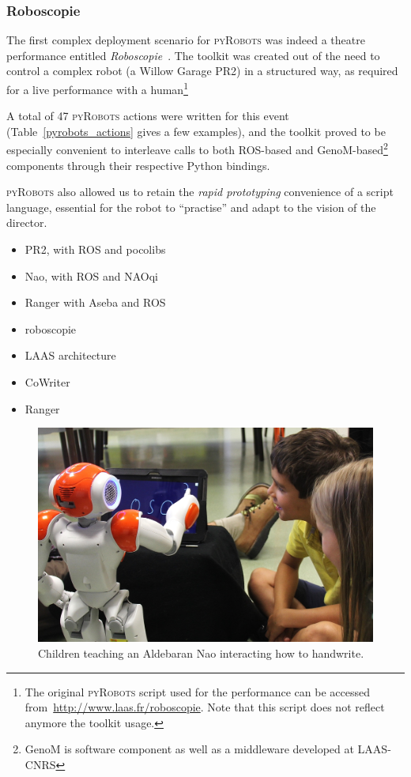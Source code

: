 \documentclass[a4paper, 10pt, conference]{ieeeconf}      %
\newcommand{\pyRobots}{\textsc{pyRobots}}
\begin{document}
\subsubsection{Roboscopie} The first complex deployment scenario for \pyRobots{} was
indeed a theatre performance entitled
\emph{Roboscopie}~\cite{lemaignan2012roboscopie}. The toolkit was created out of
the need to control a complex robot (a Willow Garage PR2) in a structured way,
as required for a live performance with a human\footnote{The original \pyRobots{}
script used for the performance can be accessed
from~\url{http://www.laas.fr/roboscopie}. Note that this script does not
reflect anymore the toolkit usage.}

A total of 47 \pyRobots{} actions were written for this event
(Table~\ref{pyrobots_actions} gives a few examples), and the toolkit proved to
be especially convenient to interleave calls to both ROS-based and {\sc
GenoM}-based\footnote{{\sc GenoM} is software component as well as a middleware
developed at LAAS-CNRS} components through their respective Python bindings.

\pyRobots{} also allowed us to retain the \emph{rapid prototyping} convenience of a
script language, essential for the robot to ``practise'' and adapt to the
vision of the director.

\begin{itemize}
    \item PR2, with ROS and pocolibs
    \item Nao, with ROS and NAOqi
    \item Ranger with Aseba and ROS
\end{itemize}


\begin{itemize}
    \item roboscopie
    \item LAAS architecture
    \item CoWriter
    \item Ranger
\end{itemize}

\begin{figure}
        \centering
        \includegraphics[width=0.9\columnwidth]{cowriter}
        \caption{Children teaching an Aldebaran Nao interacting how to
        handwrite.}
        \label{expe-cowriter}
\end{figure}
\end{document}
